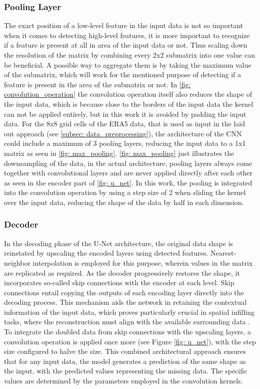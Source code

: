 \subsubsection*{Pooling Layer}

The exact position of a low-level feature in the input data is not so important when it comes to detecting high-level features,
it is more important to recognize if a feature is present at all in area of the input data or not.
Thus scaling down the resolution of the matrix by combining every 2x2 submatrix into one value can be beneficial.
A possible way to aggregate them is by taking the maximum value of the submatrix, which will work for the mentioned purpose of detecting if a feature is present in the area of the submatrix or not. In \autoref{fig: convolution_operation} the convolution operation itself also reduces the shape of the input data, which is because close to the borders of the input data the kernel can not be applied entirely, but in this work it is avoided by padding the input data. For the 8x8 grid cells of the ERA5 data, that is used as input in the laid out approach (see \autoref{subsec: data_preprocessing}), the architecture of the CNN could include a maximum of 3 pooling layers, reducing the input data to a 1x1 matrix as seen in \autoref{fig: max_pooling}. \autoref{fig: max_pooling} just illustrates the downsampling of the data, in the actual architecture, pooling layers always come together with convolutional layers and are never applied directly after each other as seen in the encoder part of \autoref{fig: u_net}.
In this work, the pooling is integrated into the convolution operation by using a step size of 2 when sliding the kernel over the input data, reducing the shape of the data by half in each dimension.

\subsubsection*{Decoder}

In the decoding phase of the U-Net architecture, the original data shape is reinstated by upscaling the encoded layers using detected features. Nearest-neighbor interpolation is employed for this purpose, wherein values in the matrix are replicated as required.
As the decoder progressively restores the shape, it incorporates so-called skip connections with the encoder at each level. Skip connections entail copying the outputs of each encoding layer directly into the decoding process.
This mechanism aids the network in retaining the contextual information of the input data, which proves particularly crucial in spatial infilling tasks, where the reconstruction must align with the available surrounding data \cite{liu2018inpaining}.
To integrate the doubled data from skip connections with the upscaling layers, a convolution operation is applied once more (see Figure \ref{fig: u_net}), with the step size configured to halve the size.
This combined architectural approach ensures that for any input data, the model generates a prediction of the same shape as the input, with the predicted values representing the missing data.
The specific values are determined by the parameters employed in the convolution kernels.

